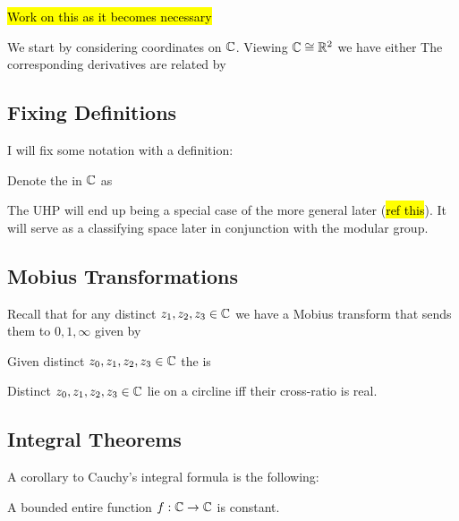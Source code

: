 \documentclass{article}
\begin{document}
\hl{Work on this as it becomes necessary}

We start by considering coordinates on $\mathbb{C}$. Viewing $\mathbb{C}\cong \mathbb{R}^2$ we have either 
The corresponding derivatives are related by 

\subsection{Fixing Definitions}
I will fix some notation with a definition:
\begin{definition}
	Denote the  in $\mathbb{C}$ as 
\end{definition}

The UHP will end up being a special case of the more general  later (\hl{ref this}). It will serve as a classifying space later in conjunction with the modular group. 

\subsection{Mobius Transformations}
Recall that for any distinct $z_1, z_2, z_3 \in \mathbb{C}$ we have a Mobius transform that sends them to $0,1,\infty$ given by 
\begin{definition}
	Given distinct $z_0, z_1, z_2, z_3 \in \mathbb{C}$ the  is 
\end{definition}

\begin{prop}
	Distinct $z_0, z_1, z_2, z_3 \in \mathbb{C}$ lie on a circline iff their cross-ratio is real. 
\end{prop}

\subsection{Integral Theorems}

A corollary to Cauchy's integral formula is the following:

\begin{theorem}[Liouville]
	A bounded entire function $f:\mathbb{C} \to \mathbb{C}$ is constant. 
\end{theorem}
\end{document}
